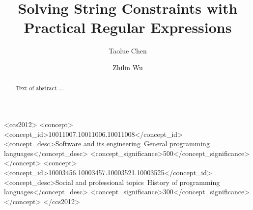 \documentclass[sigplan,review,anonymous]{acmart}\settopmatter{printfolios=true,printccs=false,printacmref=false}
\begin{document}
\title{Solving String Constraints with \\ Practical Regular Expressions}



\author{Taolue Chen}

\author{Zhilin Wu}


\begin{abstract}
Text of abstract \ldots.
\end{abstract}


\begin{CCSXML}
<ccs2012>
<concept>
<concept_id>10011007.10011006.10011008</concept_id>
<concept_desc>Software and its engineering~General programming languages</concept_desc>
<concept_significance>500</concept_significance>
</concept>
<concept>
<concept_id>10003456.10003457.10003521.10003525</concept_id>
<concept_desc>Social and professional topics~History of programming languages</concept_desc>
<concept_significance>300</concept_significance>
</concept>
</ccs2012>
\end{CCSXML}
\end{document}
